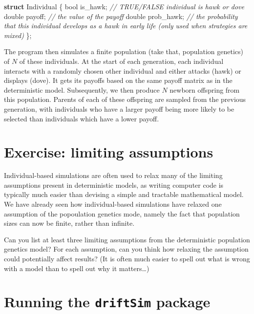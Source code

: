 \documentclass[
]{book}
\newenvironment{Shaded}{\begin{snugshade}}{\end{snugshade}}
\newcommand{\CommentTok}[1]{\textcolor[rgb]{0.56,0.35,0.01}{\textit{#1}}}
\newcommand{\DataTypeTok}[1]{\textcolor[rgb]{0.13,0.29,0.53}{#1}}
\newcommand{\KeywordTok}[1]{\textcolor[rgb]{0.13,0.29,0.53}{\textbf{#1}}}
\newcommand{\NormalTok}[1]{#1}
\begin{document}
\begin{Shaded}
\begin{Highlighting}[]
\KeywordTok{struct}\NormalTok{ Individual \{}
    \DataTypeTok{bool}\NormalTok{ is\_hawk; }\CommentTok{// TRUE/FALSE individual is hawk or dove}
    \DataTypeTok{double}\NormalTok{ payoff; }\CommentTok{// the value of the payoff}
    \DataTypeTok{double}\NormalTok{ prob\_hawk; }\CommentTok{// the probability that this individual develops as a hawk in early life (only used when strategies are mixed)}
\NormalTok{\};}
\end{Highlighting}
\end{Shaded}

The program then simulates a finite population (take that, population genetics) of \(N\) of these individuals. At the start of each generation, each individual interacts with a randomly chosen other individual and either attacks (hawk) or displays (dove). It gets its payoffs based on the same payoff matrix as in the deterministic model. Subsequently, we then produce \(N\) newborn offspring from this population. Parents of each of these offspring are sampled from the previous generation, with individuals who have a larger payoff being more likely to be selected than individuals which have a lower payoff.

\hypertarget{exercise-limiting-assumptions}{%
\section{Exercise: limiting assumptions}\label{exercise-limiting-assumptions}}

Individual-based simulations are often used to relax many of the limiting assumptions present in deterministic models, as writing computer code is typically much easier than devising a simple and tractable mathematical model. We have already seen how individual-based simulations have relaxed one assumption of the popoulation genetics mode, namely the fact that population sizes can now be finite, rather than infinite.

Can you list at least three limiting assumptions from the deterministic population genetics model? For each assumption, can you think how relaxing the assumption could potentially affect results? (It is often much easier to spell out what is wrong with a model than to spell out why it matters\ldots)

\hypertarget{running-the-driftsim-package}{%
\section{\texorpdfstring{Running the \texttt{driftSim} package}{Running the driftSim package}}\label{running-the-driftsim-package}}
\end{document}
